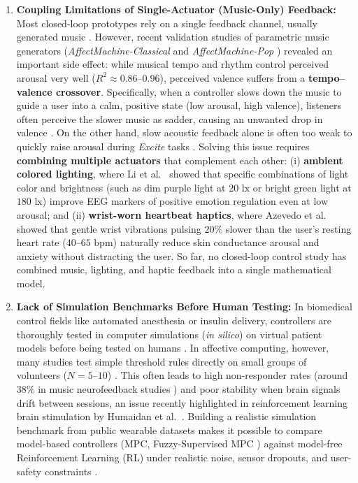 \documentclass[preprint,12pt]{elsarticle}
\begin{document}
\begin{enumerate}
    \item \textbf{Coupling Limitations of Single-Actuator (Music-Only) Feedback:} Most closed-loop prototypes rely on a single feedback channel, usually generated music \cite{sayal2025music,daly2016affective,ehrlich2019closed}. However, recent validation studies of parametric music generators (\emph{AffectMachine-Classical} \cite{agres2023affectmachine} and \emph{AffectMachine-Pop} \cite{agres2025affectmachine}) revealed an important side effect: while musical tempo and rhythm control perceived arousal very well ($R^2 \approx 0.86\text{--}0.96$), perceived valence suffers from a \textbf{tempo--valence crossover}. Specifically, when a controller slows down the music to guide a user into a calm, positive state (low arousal, high valence), listeners often perceive the slower music as sadder, causing an unwanted drop in valence \cite{ehrlich2019closed,agres2023affectmachine,agres2025affectmachine}. On the other hand, slow acoustic feedback alone is often too weak to quickly raise arousal during \emph{Excite} tasks \cite{daly2016affective}. Solving this issue requires \textbf{combining multiple actuators} that complement each other: (i) \textbf{ambient colored lighting}, where Li et al.~\cite{li2025designing} showed that specific combinations of light color and brightness (such as dim purple light at $20\text{ lx}$ or bright green light at $180\text{ lx}$) improve EEG markers of positive emotion regulation even at low arousal; and (ii) \textbf{wrist-worn heartbeat haptics}, where Azevedo et al.~\cite{azevedo2017calming} showed that gentle wrist vibrations pulsing $20\%$ slower than the user's resting heart rate ($40\text{--}65\text{ bpm}$) naturally reduce skin conductance arousal and anxiety without distracting the user. So far, no closed-loop control study has combined music, lighting, and haptic feedback into a single mathematical model.

    \item \textbf{Lack of Simulation Benchmarks Before Human Testing:} In biomedical control fields like automated anesthesia or insulin delivery, controllers are thoroughly tested in computer simulations (\emph{in silico}) on virtual patient models before being tested on humans \cite{azgomi2022enhancement}. In affective computing, however, many studies test simple threshold rules directly on small groups of volunteers ($N = 5\text{--}10$) \cite{zhang2026closed,sayal2025music,ramirez2015musical,ehrlich2019closed}. This often leads to high non-responder rates (around $38\%$ in music neurofeedback studies \cite{sayal2025music}) and poor stability when brain signals drift between sessions, an issue recently highlighted in reinforcement learning brain stimulation by Humaidan et al.~\cite{humaidan2026first}. Building a realistic simulation benchmark from public wearable datasets makes it possible to compare model-based controllers (MPC, Fuzzy-Supervised MPC \cite{azgomi2022enhancement}) against model-free Reinforcement Learning (RL) \cite{humaidan2026first} under realistic noise, sensor dropouts, and user-safety constraints \cite{steinert2020wired}.
\end{enumerate}
\end{document}
